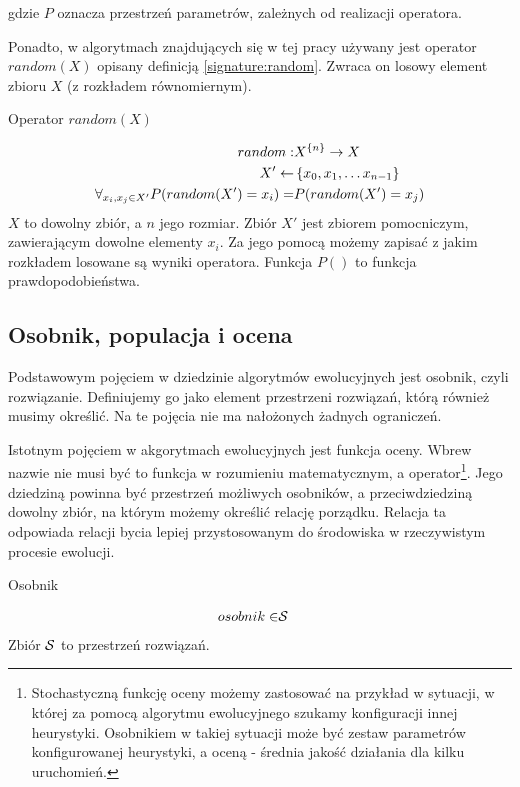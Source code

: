 \documentclass[./FM_mgr.tex]{subfiles}
\begin{document}
gdzie $P$ oznacza przestrzeń parametrów, zależnych od realizacji operatora.

Ponadto, w algorytmach znajdujących się w tej pracy używany jest operator $random(X)$ opisany definicją \ref{signature:random}.
Zwraca on losowy element zbioru $X$ (z rozkładem równomiernym).

\begin{signature}
	\caption{Operator $random(X)$ \label{signature:random}}
	\begin{align}
		random: &{X}^{ \{ n \}} \rightarrow X \\
		X' \gets &\left\{ x_0, x_1, \dots x_{n-1} \right\} \\
		\forall_{x_i, x_j \in X'} P(random(X') = x_i) = &P(random(X') = x_j)
	\end{align}
	$X$ to dowolny zbiór, a $n$ jego rozmiar.
	Zbiór $X'$ jest zbiorem pomocniczym, zawierającym dowolne elementy $x_i$.
	Za jego pomocą możemy zapisać z jakim rozkładem losowane są wyniki operatora.
	Funkcja $P()$ to funkcja prawdopodobieństwa.
\end{signature}

\subsection{Osobnik, populacja i ocena} \label{subsection:specimen_and_foo}

Podstawowym pojęciem w dziedzinie algorytmów ewolucyjnych jest osobnik, czyli rozwiązanie. 
Definiujemy go jako element przestrzeni rozwiązań, którą również musimy określić. 
Na te pojęcia nie ma nałożonych żadnych ograniczeń.

Istotnym pojęciem w akgorytmach ewolucyjnych jest funkcja oceny. 
Wbrew nazwie nie musi być to funkcja w rozumieniu matematycznym, a operator\footnote{
	Stochastyczną funkcję oceny możemy zastosować na przykład w sytuacji, w której za pomocą algorytmu ewolucyjnego szukamy konfiguracji innej heurystyki. 
	Osobnikiem w takiej sytuacji może być zestaw parametrów konfigurowanej heurystyki, a oceną - średnia jakość działania dla kilku uruchomień.
}. 
Jego dziedziną powinna być przestrzeń możliwych osobników, a przeciwdziedziną dowolny zbiór, na którym możemy określić relację porządku. 
Relacja ta odpowiada relacji bycia lepiej przystosowanym do środowiska w rzeczywistym procesie ewolucji.


\begin{signature}
	\caption{Osobnik \label{signature:specimen}}
	\begin{align}
		osobnik \in &\mathcal{S}
	\end{align}
	Zbiór $\mathcal{S}$ to przestrzeń rozwiązań.
\end{signature}
\end{document}
